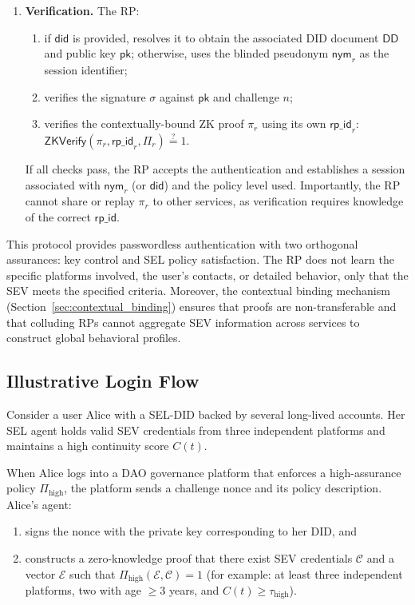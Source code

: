 \documentclass[11pt]{article}
\begin{document}
\begin{enumerate}
  \item \textbf{Verification.} The RP:
  \begin{enumerate}
    \item if $\mathsf{did}$ is provided, resolves it to obtain the associated DID document $\mathsf{DD}$ and public key $\mathsf{pk}$; otherwise, uses the blinded pseudonym $\mathsf{nym}_r$ as the session identifier;
    \item verifies the signature $\sigma$ against $\mathsf{pk}$ and challenge $n$;
    \item verifies the contextually-bound ZK proof $\pi_r$ using its own $\mathsf{rp\_id}_r$: $\textsf{ZKVerify}(\pi_r, \mathsf{rp\_id}_r, \Pi_r) \stackrel{?}{=} 1$.
  \end{enumerate}
  If all checks pass, the RP accepts the authentication and establishes a session associated with $\mathsf{nym}_r$ (or $\mathsf{did}$) and the policy level used. Importantly, the RP cannot share or replay $\pi_r$ to other services, as verification requires knowledge of the correct $\mathsf{rp\_id}$.
\end{enumerate}

This protocol provides passwordless authentication with two orthogonal assurances: key control and SEL policy satisfaction. The RP does not learn the specific platforms involved, the user's contacts, or detailed behavior, only that the SEV meets the specified criteria. Moreover, the contextual binding mechanism (Section~\ref{sec:contextual_binding}) ensures that proofs are non-transferable and that colluding RPs cannot aggregate SEV information across services to construct global behavioral profiles.

\subsection{Illustrative Login Flow}

Consider a user Alice with a SEL-DID backed by several long-lived accounts. Her SEL agent holds valid SEV credentials from three independent platforms and maintains a high continuity score $C(t)$.

When Alice logs into a DAO governance platform that enforces a high-assurance policy $\Pi_{\text{high}}$, the platform sends a challenge nonce and its policy description. Alice's agent:

\begin{enumerate}
  \item signs the nonce with the private key corresponding to her DID, and
  \item constructs a zero-knowledge proof that there exist SEV credentials $\mathcal{C}$ and a vector $\mathcal{E}$ such that $\Pi_{\text{high}}(\mathcal{E}, \mathcal{C}) = 1$ (for example: at least three independent platforms, two with age $\geq 3$ years, and $C(t) \geq \tau_{\text{high}}$).
\end{enumerate}
\end{document}
